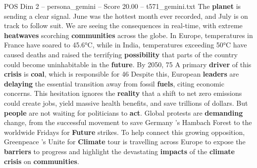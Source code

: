 \begin{textsample}{POS Dim 2 – persona\_gemini – Score 20.00 – t571\_gemini.txt}  \label{ex:f2_pos_045}
The \textbf{planet} is sending a clear signal.
June was the hottest month ever recorded, and July is on track to follow suit.
We are seeing the consequences in real-time, with extreme \textbf{heatwaves} scorching \textbf{communities} across the globe.
In Europe, temperatures in France have soared to 45.6°C, while in India, temperatures exceeding 50°C have caused deaths and raised the terrifying \textbf{possibility} that parts of the country could become uninhabitable in the \textbf{future}.
By 2050, 75 %
A primary \textbf{driver} of this \textbf{crisis} is \textbf{coal}, which is responsible for 46 %
Despite this, European \textbf{leaders} are \textbf{delaying} the essential transition away from fossil \textbf{fuels}, citing economic concerns.
This hesitation ignores the \textbf{reality} that a shift to net zero emissions could create jobs, yield massive health benefits, and save trillions of dollars.
But \textbf{people} are not waiting for politicians to \textbf{act}.
Global protests are \textbf{demanding} change, from the successful movement to save Germany 's Hambach Forest to the worldwide Fridays for \textbf{Future} strikes.
To help connect this growing opposition, Greenpeace 's Unite for \textbf{Climate} tour is travelling across Europe to expose the \textbf{barriers} to progress and highlight the devastating \textbf{impacts} of the \textbf{climate} \textbf{crisis} on \textbf{communities}.

\end{textsample}
